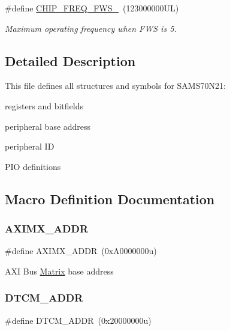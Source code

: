 \begin{DoxyCompactItemize}
\mbox{\label{group__SAMS70N21__definitions_ga3b66824f858591135877b369f98d48a5}} 
\#define \mbox{\hyperlink{group__SAMS70N21__definitions_ga3b66824f858591135877b369f98d48a5}{C\+H\+I\+P\+\_\+\+F\+R\+E\+Q\+\_\+\+F\+W\+S\+\_}}~(123000000\+U\+L)
\begin{DoxyCompactList}\small\item\em Maximum operating frequency when F\+WS is 5. \end{DoxyCompactList}\end{DoxyCompactItemize}


\subsection{Detailed Description}
This file defines all structures and symbols for S\+A\+M\+S70\+N21\+:
\begin{DoxyItemize}
\item registers and bitfields
\item peripheral base address
\item peripheral ID
\item P\+IO definitions 
\end{DoxyItemize}

\subsection{Macro Definition Documentation}
\mbox{\label{group__SAMS70N21__definitions_ga2fb7cc681bf5e7fbce5e3635b72a330a}} 
\subsubsection{\texorpdfstring{AXIMX\_ADDR}{AXIMX\_ADDR}}
{\footnotesize\ttfamily \#define A\+X\+I\+M\+X\+\_\+\+A\+D\+DR~(0x\+A0000000u)}

A\+XI Bus \mbox{\hyperlink{structMatrix}{Matrix}} base address \mbox{\label{group__SAMS70N21__definitions_ga26626a425f7ebb3a0c2dbc276f0d9f78}} 
\subsubsection{\texorpdfstring{DTCM\_ADDR}{DTCM\_ADDR}}
{\footnotesize\ttfamily \#define D\+T\+C\+M\+\_\+\+A\+D\+DR~(0x20000000u)}

